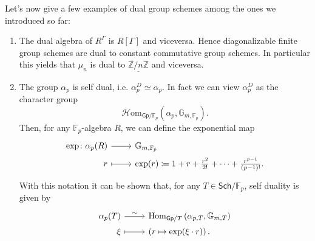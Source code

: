 \noindent
Let's now give a few examples of dual group schemes among the ones we introduced so far:
\begin{ex}[]\leavevmode\vspace{-.2\baselineskip}\label{ex:GroupSchemeDuality}
\begin{enumerate}
	\item The dual algebra of $R^\Gamma$ is $R[\Gamma]$ and viceversa.
		Hence diagonalizable finite group schemes are dual to constant commutative group schemes.
		In particular this yields that $\mu_n$ is dual to $\underline{\mathbb{Z}/n\mathbb{Z}}$
		and viceversa.

	\item The group \(\alpha_p\) is self dual, i.e$.$ $\alpha_p^D \simeq \alpha_p$.
		In fact we can view $\alpha_p^D$ as the character group
		\begin{equation*}
			\mathcal{H}\mathrm{om}_{\mathsf{Gp}/\mathbb{F}_{ p }}
			\left( \alpha_{p}, \mathbb{G}_{m,\mathbb{F}_{ p }} \right)
		.\end{equation*}
		Then, for any $\mathbb{F}_{p}$-algebra $R$, we can define the exponential map
		\begin{equation*}
		\begin{tikzcd}[row sep = 0ex
			,/tikz/column 1/.append style={anchor=base east}
			,/tikz/column 2/.append style={anchor=base west}]
			\mathrm{exp}\colon \alpha_p(R) \arrow[r, "", rightarrow] &
			\mathbb{G}_{m,\mathbb{F}_{p}} \\
			r \arrow[r, "", mapsto] & \mathrm{exp}(r) \coloneqq
			1 + r + \frac{r^2}{2!} + \cdots + \frac{r^{p-1}}{\left( p-1 \right)!}
		.\end{tikzcd}
		\end{equation*} 
		With this notation it can be shown that, for any
		$T \in \mathsf{Sch}/\mathbb{F}_{p}$, self duality is given by
		\begin{equation*}
		\begin{tikzcd}[row sep = 0ex
			,/tikz/column 1/.append style={anchor=base east}
			,/tikz/column 2/.append style={anchor=base west}]
			\alpha_p(T) \arrow[r, "\sim", rightarrow] &
			\Hom_{\mathsf{Gp}/T}
			\left( \alpha_{ p,T }, \mathbb{G}_{m,T} \right) \\
			\xi \arrow[r, "", mapsto] & 
			\left( r \mapsto \mathrm{exp}(\xi \cdot r) \right)
		.\end{tikzcd}
		\end{equation*} 
\end{enumerate}
\end{ex}



